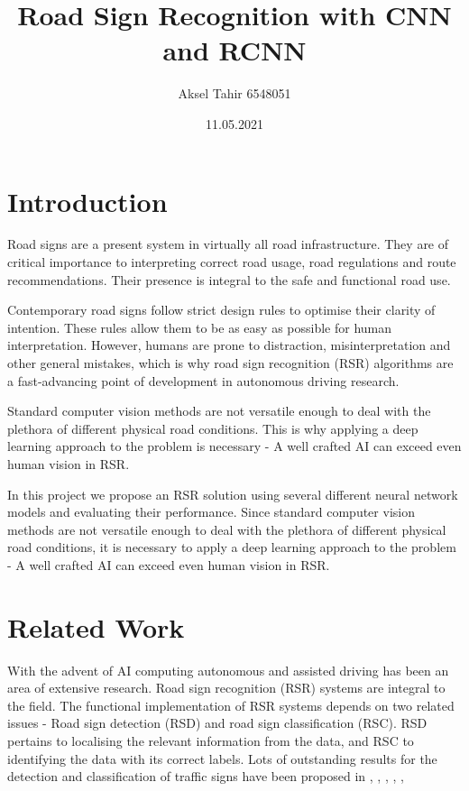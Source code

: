 \documentclass[12pt, landscape]{article}
\title{Road Sign Recognition with CNN and RCNN}
\author{Aksel Tahir 6548051}
\date{11.05.2021}
\begin{document}
\maketitle
\tableofcontents
\pagebreak

\begin{multicols}{3}
\section{Introduction}
Road signs are a present system in virtually all road infrastructure. They are
of critical importance to interpreting correct road usage, road regulations and
route recommendations. Their presence is integral to the safe and functional
road use.

Contemporary road signs follow strict design rules to optimise their clarity of
intention. These rules allow them to be as easy as possible for human
interpretation. However, humans are prone to distraction, misinterpretation and
other general mistakes, which is why road sign recognition (RSR) algorithms
are a fast-advancing point of development in autonomous driving research.

Standard computer vision methods are not versatile enough to deal with the
plethora of different physical road conditions. This is why applying a deep
learning approach to the problem is necessary - A well crafted AI can exceed
even human vision in RSR.

In this project we propose an RSR solution using several different neural
network models and evaluating their performance. Since standard computer vision
methods are not versatile enough to deal with the plethora of different physical
road conditions, it is necessary to apply a deep learning approach to the
problem - A well crafted AI can exceed even human vision in RSR.

\section{Related Work}
With the advent of AI computing autonomous and assisted driving has been an area
of extensive research. Road sign recognition (RSR) systems are integral to the
field. The functional implementation of RSR systems depends on two related
issues - Road sign detection (RSD) and road sign classification (RSC). RSD
pertains to localising the relevant information from the data, and RSC to
identifying the data with its correct labels. Lots of outstanding results for
the detection and classification of traffic signs have been proposed in
\citep{Classification1}, \citep{Classification2}, \citep{Classification3},
\citep{Classification4}, \citep{Classification5}, 


\end{multicols}
\end{document}
